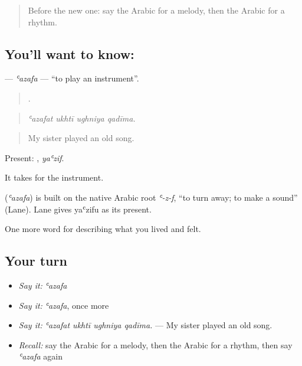 \label{lesson:AR-C543-azafa}



\begin{quote}
Before the new one: say the Arabic for a melody, then the Arabic for a rhythm.
\end{quote}

\subsection*{You'll want to know: }
\textbf{} — \emph{ʿazafa} — \textquotedblleft{}to play an instrument\textquotedblright{}.

\begin{quote}
   .
\end{quote}

\begin{quote}
\emph{ʿazafat ukhtī ughniya qadīma.}
\end{quote}

\begin{quote}
My sister played an old song.
\end{quote}

Present: , \emph{yaʿzif}.

It takes  for the instrument.

\begin{cousinweb}
\textbf{} (\emph{ʿazafa}) is built on the native Arabic root \emph{ʿ-z-f}, \textquotedblleft{}to turn away; to make a sound\textquotedblright{} (Lane). Lane gives yaʿzifu as its present.
\end{cousinweb}

\begin{grammarlens}[title={What you've built}]
One more word for describing what you lived and felt.
\end{grammarlens}

\subsection*{Your turn}
\begin{itemize}
\raggedright
  \item \emph{Say it:} \emph{ʿazafa}
  \item \emph{Say it:} \emph{ʿazafa}, once more
  \item \emph{Say it:} \emph{ʿazafat ukhtī ughniya qadīma.} — My sister played an old song.
  \item \emph{Recall:} say the Arabic for a melody, then the Arabic for a rhythm, then say \emph{ʿazafa} again
\end{itemize}


